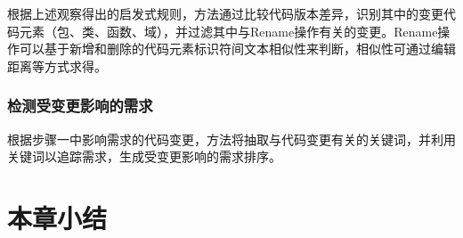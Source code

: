 根据上述观察得出的启发式规则，方法通过比较代码版本差异，识别其中的变更代码元素（包、类、函数、域），并过滤其中与Rename操作有关的变更。Rename操作可以基于新增和删除的代码元素标识符间文本相似性来判断，相似性可通过编辑距离\cite{levenshtein1966binary}等方式求得。

\subsubsection{检测受变更影响的需求}
根据步骤一中影响需求的代码变更，方法将抽取与代码变更有关的关键词，并利用关键词以追踪需求，生成受变更影响的需求排序。

\section{本章小结}

% 